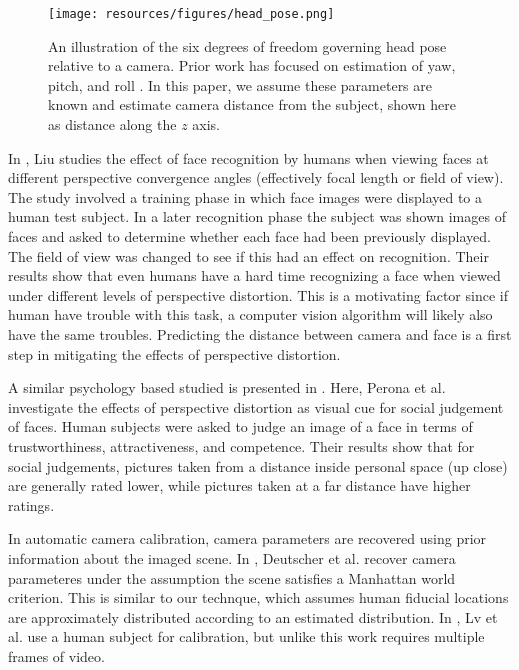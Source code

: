 \documentclass[runningheads]{llncs}
\begin{document}
\begin{figure}[ht]
\centering
\texttt{[image: resources/figures/head\_pose.png]}
\caption{
An illustration of the six degrees of freedom governing head pose relative to a camera.
Prior work has focused on estimation of yaw, pitch, and roll \cite{murphy2009head}.
In this paper, we assume these parameters are known and estimate camera distance from the subject, shown here as distance along the $z$ axis.
}
\label{fig:head_pose}
\end{figure}

In \cite{liu2003face,liu2006face}, Liu studies the effect of face recognition by humans when viewing faces at different perspective convergence angles (effectively focal length or field of view). 
The study involved a training phase in which face images were displayed to a human test subject.
In a later recognition phase the subject was shown images of faces and asked to determine whether each face had been previously displayed.
The field of view was changed to see if this had an effect on recognition. 
Their results show that even humans have a hard time recognizing a face when viewed under different levels of perspective distortion.  
This is a motivating factor since if human have trouble with this task, a computer vision algorithm will likely also have the same troubles.  
Predicting the distance between camera and face is a first step in mitigating the effects of perspective distortion.

A similar psychology based studied is presented in \cite{perona2007new,bryan2012perspective}. 
Here, Perona et al. investigate the effects of perspective distortion as visual cue for social judgement of faces.  
Human subjects were asked to judge an image of a face in terms of trustworthiness, attractiveness, and competence.  
Their results show that for social judgements, pictures taken from a distance inside personal space (up close) are generally rated lower, while pictures taken at a far distance have higher ratings.

In automatic camera calibration, camera parameters are recovered using prior information about the imaged scene.
In \cite{deutscher}, Deutscher et al. recover camera parameteres under the assumption the scene satisfies a Manhattan world criterion.
This is similar to our technque, which assumes human fiducial locations are approximately distributed according to an estimated distribution. 
In \cite{lv2006}, Lv et al. use a human subject for calibration, but unlike this work requires multiple frames of video.
\end{document}
